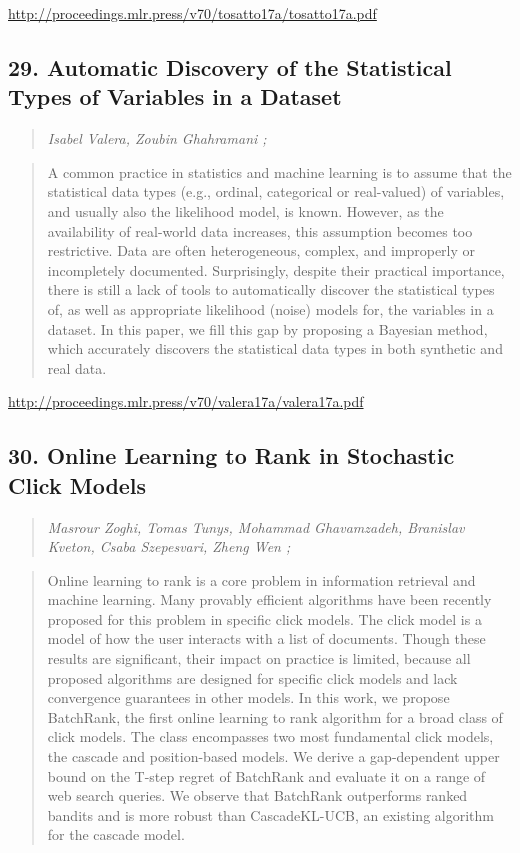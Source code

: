\documentclass{article}
\begin{document}
\href{http://proceedings.mlr.press/v70/tosatto17a/tosatto17a.pdf}{http://proceedings.mlr.press/v70/tosatto17a/tosatto17a.pdf}

\subsection{29. Automatic Discovery of the Statistical Types of Variables in a Dataset}

\begin{quote}
\footnotesize{\textit{Isabel Valera, Zoubin Ghahramani ;}}
\end{quote}

\begin{quote}
    A common practice in statistics and machine learning is to assume that the statistical data types (e.g., ordinal, categorical or real-valued) of variables, and usually also the likelihood model, is known. However, as the availability of real-world data increases, this assumption becomes too restrictive. Data are often heterogeneous, complex, and improperly or incompletely documented. Surprisingly, despite their practical importance, there is still a lack of tools to automatically discover the statistical types of, as well as appropriate likelihood (noise) models for, the variables in a dataset. In this paper, we fill this gap by proposing a Bayesian method, which accurately discovers the statistical data types in both synthetic and real data.  \end{quote}

\href{http://proceedings.mlr.press/v70/valera17a/valera17a.pdf}{http://proceedings.mlr.press/v70/valera17a/valera17a.pdf}

\subsection{30. Online Learning to Rank in Stochastic Click Models}

\begin{quote}
\footnotesize{\textit{Masrour Zoghi, Tomas Tunys, Mohammad Ghavamzadeh, Branislav Kveton, Csaba Szepesvari, Zheng Wen ;}}
\end{quote}

\begin{quote}
    Online learning to rank is a core problem in information retrieval and machine learning. Many provably efficient algorithms have been recently proposed for this problem in specific click models. The click model is a model of how the user interacts with a list of documents. Though these results are significant, their impact on practice is limited, because all proposed algorithms are designed for specific click models and lack convergence guarantees in other models. In this work, we propose BatchRank, the first online learning to rank algorithm for a broad class of click models. The class encompasses two most fundamental click models, the cascade and position-based models. We derive a gap-dependent upper bound on the T-step regret of BatchRank and evaluate it on a range of web search queries. We observe that BatchRank outperforms ranked bandits and is more robust than CascadeKL-UCB, an existing algorithm for the cascade model.  \end{quote}
\end{document}
